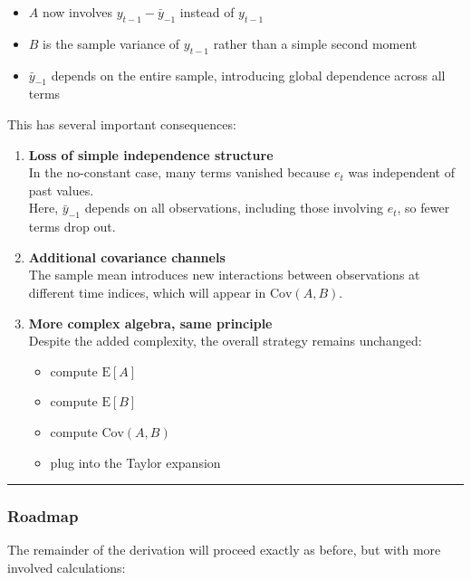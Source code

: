 \documentclass[11pt]{article}
\providecommand{\tightlist}{%
      \setlength{\itemsep}{0pt}\setlength{\parskip}{0pt}}
\begin{document}
\begin{itemize}
\tightlist
\item
  \(A\) now involves \(y_{t-1} - \bar y_{-1}\) instead of \(y_{t-1}\)
\item
  \(B\) is the sample variance of \(y_{t-1}\) rather than a simple
  second moment
\item
  \(\bar y_{-1}\) depends on the entire sample, introducing global
  dependence across all terms
\end{itemize}

This has several important consequences:

\begin{enumerate}
\def\labelenumi{\arabic{enumi}.}
\item
  \textbf{Loss of simple independence structure}\\
  In the no-constant case, many terms vanished because \(e_t\) was
  independent of past values.\\
  Here, \(\bar y_{-1}\) depends on all observations, including those
  involving \(e_t\), so fewer terms drop out.
\item
  \textbf{Additional covariance channels}\\
  The sample mean introduces new interactions between observations at
  different time indices, which will appear in \(\text{Cov}(A,B)\).
\item
  \textbf{More complex algebra, same principle}\\
  Despite the added complexity, the overall strategy remains unchanged:

  \begin{itemize}
  \tightlist
  \item
    compute \(\text{E}[A]\)
  \item
    compute \(\text{E}[B]\)
  \item
    compute \(\text{Cov}(A,B)\)
  \item
    plug into the Taylor expansion
  \end{itemize}
\end{enumerate}

\begin{center}\rule{0.5\linewidth}{0.5pt}\end{center}

\subsubsection{Roadmap}\label{roadmap}

The remainder of the derivation will proceed exactly as before, but with
more involved calculations:
\end{document}
